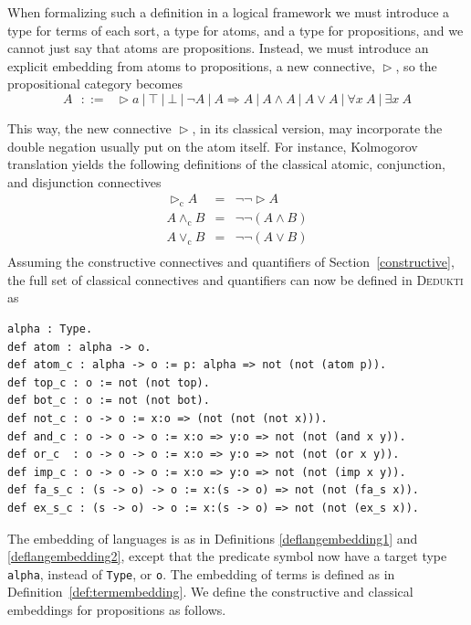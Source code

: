 \documentclass[english]{lipics}
\newcommand\fa{\forall}
\newcommand\ex{\exists}
\DeclareMathOperator{\ato}{\triangleright}
\newcommand\lst[1]{{\rm \lstinline{#1}}}
\begin{document}
When formalizing such a definition in a logical framework we must introduce
a type for terms of each sort, a type for atoms, and a type for propositions,
and we cannot just say that atoms are propositions.
Instead, we must introduce an explicit embedding from atoms to propositions,
a new connective, $\ato$, so the propositional category becomes
$$
A~~~::=~~~\ato a~|~\top~|~\bot~|~\neg A~|~A \Rightarrow A
~|~A \wedge A~|~A \vee A~|~\fa x~A~|~\ex x~A
$$

This way, the new connective $\ato$, in its classical version, may
incorporate the double negation usually put on the atom itself.
For instance, Kolmogorov translation yields the following definitions of
the classical atomic, conjunction, and disjunction connectives
$$
\begin{array}{rcl}
  \ato_{\mathrm c} A & = & \neg \neg \ato A\\
  A \land_{\mathrm c} B & = & \neg \neg (A \land B)\\
  A \lor_{\mathrm c} B & = & \neg \neg (A \lor B) \\
\end{array}
$$
Assuming the constructive connectives and quantifiers of
Section~\ref{constructive}, the full set of classical connectives and
quantifiers can now be defined in \textsc{Dedukti} as
\begin{lstlisting}
alpha : Type.
def atom : alpha -> o.
def atom_c : alpha -> o := p: alpha => not (not (atom p)).
def top_c : o := not (not top).
def bot_c : o := not (not bot).
def not_c : o -> o := x:o => (not (not (not x))).
def and_c : o -> o -> o := x:o => y:o => not (not (and x y)).
def or_c  : o -> o -> o := x:o => y:o => not (not (or x y)).
def imp_c : o -> o -> o := x:o => y:o => not (not (imp x y)).
def fa_s_c : (s -> o) -> o := x:(s -> o) => not (not (fa_s x)).
def ex_s_c : (s -> o) -> o := x:(s -> o) => not (not (ex_s x)).
\end{lstlisting}

The embedding of languages is as in Definitions
\ref{deflangembedding1} and \ref{deflangembedding2}, except that the
predicate symbol now have a target type \lst{alpha}, instead of
\lst{Type}, or \lst{o}.  The embedding of terms is defined as in
Definition~\ref{def:termembedding}.  We define the constructive and
classical embeddings for propositions as follows.
\end{document}
